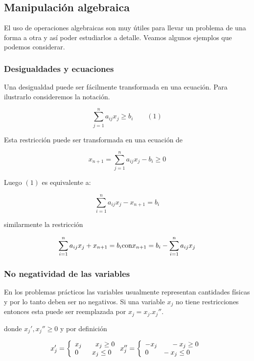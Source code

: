 \documentclass[]{article}
\begin{document}
\hypertarget{manipulaciuxf3n-algebraica}{%
\subsection{Manipulación algebraica}\label{manipulaciuxf3n-algebraica}}

El uso de operaciones algebraicas son muy útiles para llevar un problema
de una forma a otra y así poder estudiarlos a detalle. Veamos algunos
ejemplos que podemos considerar.

\hypertarget{desigualdades-y-ecuaciones}{%
\subsubsection{Desigualdades y
ecuaciones}\label{desigualdades-y-ecuaciones}}

Una desigualdad puede ser fácilmente transformada en una ecuación. Para
ilustrarlo consideremos la notación.

\[\sum_{j=1}^na_{ij}x_j \ge b_i\qquad (1)\]

Esta restricción puede ser transformada en una ecuación de

\[x_{n+1}=\sum_{j=1}^n a_{ij}x_j-b_i\ge0\]

Luego \((1)\) es equivalente a:

\[\sum_{i=1}^n a_{ij}x_j-x_{n+1}=b_i\]

similarmente la restricción

\[\sum_{i=1}^n a_{ij}x_j+x_{n+1}=b_i \text{con}\\
x_{n+1}= b_i - \sum_{i=1}^n a_{ij}x_j\]

\hypertarget{no-negatividad-de-las-variables}{%
\subsubsection{No negatividad de las
variables}\label{no-negatividad-de-las-variables}}

En los problemas prácticos las variables usualmente representan
cantidades físicas y por lo tanto deben ser no negativos. Si una
variable \(x_j\) no tiene restricciones entonces esta puede ser
reemplazada por \(x_j = x_j.x_j''\).

donde \(x_j', x_j''\ge 0\) y por definición

\[x_j' = \left\lbrace
\begin{array}{ll}
x_j \qquad x_j \ge 0\\
0 \qquad x_j \le 0 
\end{array}
\right. \\\\
x_j'' = \left\lbrace
\begin{array}{ll}
-x_j \qquad -x_j \ge 0\\
0 \qquad -x_j \le 0 
\end{array}
\right. \\\]
\end{document}
